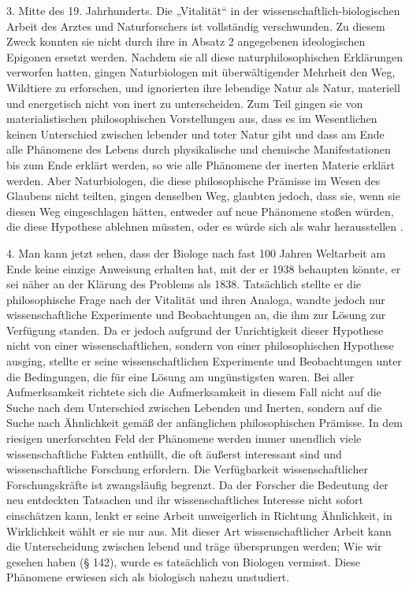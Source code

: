 \documentclass[11pt,a4paper]{book}
\begin{document}
3. Mitte des 19. Jahrhunderts. Die „Vitalität“ in der wissenschaftlich-biologischen Arbeit des Arztes und Naturforschers ist vollständig verschwunden. Zu diesem Zweck konnten sie nicht durch ihre in Absatz 2 angegebenen ideologischen Epigonen ersetzt werden. Nachdem sie all diese naturphilosophischen Erklärungen verworfen hatten, gingen Naturbiologen mit überwältigender Mehrheit den Weg, Wildtiere zu erforschen, und ignorierten ihre lebendige Natur als Natur, materiell und energetisch nicht von inert zu unterscheiden. Zum Teil gingen sie von materialistischen philosophischen Vorstellungen aus, dass es im Wesentlichen keinen Unterschied zwischen lebender und toter Natur gibt und dass am Ende alle Phänomene des Lebens durch physikalische und chemische Manifestationen bis zum Ende erklärt werden, so wie alle Phänomene der inerten Materie erklärt werden. Aber Naturbiologen, die diese philosophische Prämisse im Wesen des Glaubens nicht teilten, gingen denselben Weg, glaubten jedoch, dass sie, wenn sie diesen Weg eingeschlagen hätten, entweder auf neue Phänomene stoßen würden, die diese Hypothese ablehnen müssten, oder es würde sich als wahr herausstellen .



4. Man kann jetzt sehen, dass der Biologe nach fast 100 Jahren Weltarbeit am Ende keine einzige Anweisung erhalten hat, mit der er 1938 behaupten könnte, er sei näher an der Klärung des Problems als 1838. Tatsächlich stellte er die philosophische Frage nach der Vitalität und ihren Analoga, wandte jedoch nur wissenschaftliche Experimente und Beobachtungen an, die ihm zur Lösung zur Verfügung standen. Da er jedoch aufgrund der Unrichtigkeit dieser Hypothese nicht von einer wissenschaftlichen, sondern von einer philosophischen Hypothese ausging, stellte er seine wissenschaftlichen Experimente und Beobachtungen unter die Bedingungen, die für eine Lösung am ungünstigsten waren. Bei aller Aufmerksamkeit richtete sich die Aufmerksamkeit in diesem Fall nicht auf die Suche nach dem Unterschied zwischen Lebenden und Inerten, sondern auf die Suche nach Ähnlichkeit gemäß der anfänglichen philosophischen Prämisse. In dem riesigen unerforschten Feld der Phänomene werden immer unendlich viele wissenschaftliche Fakten enthüllt, die oft äußerst interessant sind und wissenschaftliche Forschung erfordern. Die Verfügbarkeit wissenschaftlicher Forschungskräfte ist zwangsläufig begrenzt. Da der Forscher die Bedeutung der neu entdeckten Tatsachen und ihr wissenschaftliches Interesse nicht sofort einschätzen kann, lenkt er seine Arbeit unweigerlich in Richtung Ähnlichkeit, in Wirklichkeit wählt er sie nur aus. Mit dieser Art wissenschaftlicher Arbeit kann die Unterscheidung zwischen lebend und träge übersprungen werden; Wie wir gesehen haben (§ 142), wurde es tatsächlich von Biologen vermisst. Diese Phänomene erwiesen sich als biologisch nahezu unstudiert.
\end{document}
